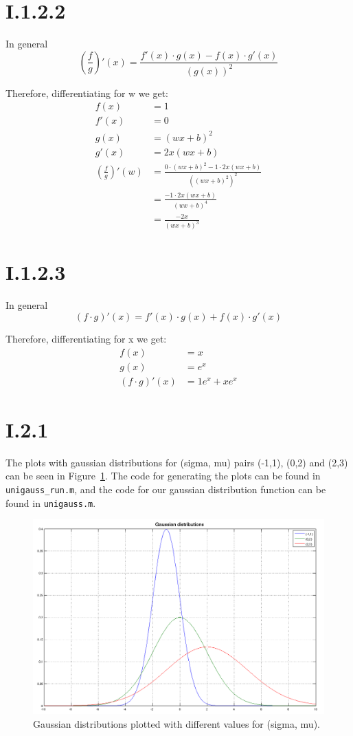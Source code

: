 \section*{I.1.2.2}
In general
\[
	\left ( \frac{f}{g} \right )' (x) = \frac{f'(x) \cdot g(x) - f(x) \cdot g'(x)}{(g(x))^2}
\]

Therefore, differentiating for w we get:
\begin{align*}
	f(x) &= 1 \\
	f'(x) &= 0 \\
	g(x) &= (wx+b)^2 \\
	g'(x) &= 2x(wx+b) \\
	\left ( \frac{f}{g} \right )' (w) &= \frac{0 \cdot (wx+b)^2 - 1 \cdot 2x(wx+b)}{((wx+b)^2)^2} \\
	&= \frac{-1 \cdot 2x(wx+b)}{(wx+b)^4} \\
	&= \frac{-2x}{(wx+b)^3}
\end{align*}

\section*{I.1.2.3}
In general
\[
	\left ( f \cdot g \right )' (x) = f'(x) \cdot g(x) + f(x) \cdot g'(x)
\]

Therefore, differentiating for x we get:
\begin{align*}
	f(x) &= x \\
	g(x) &= e^x \\
	\left ( f \cdot g \right )' (x) &= 1e^x + xe^x
\end{align*}

\pagebreak
\section*{I.2.1}
The plots with gaussian distributions for (sigma, mu) pairs (-1,1), (0,2) and
(2,3) can be seen in Figure~\ref{fig:I.2.1}. The code for generating the plots
can be found in \texttt{unigauss\_run.m}, and the code for our gaussian
distribution function can be found in \texttt{unigauss.m}.

\begin{figure}[h!]
	\includegraphics[width=\textwidth]{img/unigauss}
	\caption{Gaussian distributions plotted with different values for
          (sigma, mu). \label{fig:I.2.1}}
\end{figure}

